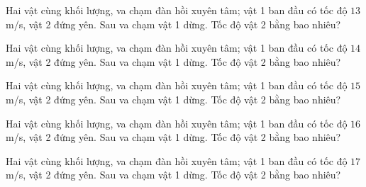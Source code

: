 \begin{ex}
Hai vật cùng khối lượng, va chạm đàn hồi xuyên tâm; vật 1 ban đầu có tốc độ $13$ m/s, vật 2 đứng yên. Sau va chạm vật 1 dừng. Tốc độ vật 2 bằng bao nhiêu?
\end{ex}

\begin{ex}
Hai vật cùng khối lượng, va chạm đàn hồi xuyên tâm; vật 1 ban đầu có tốc độ $14$ m/s, vật 2 đứng yên. Sau va chạm vật 1 dừng. Tốc độ vật 2 bằng bao nhiêu?
\end{ex}

\begin{ex}
Hai vật cùng khối lượng, va chạm đàn hồi xuyên tâm; vật 1 ban đầu có tốc độ $15$ m/s, vật 2 đứng yên. Sau va chạm vật 1 dừng. Tốc độ vật 2 bằng bao nhiêu?
\end{ex}

\begin{ex}
Hai vật cùng khối lượng, va chạm đàn hồi xuyên tâm; vật 1 ban đầu có tốc độ $16$ m/s, vật 2 đứng yên. Sau va chạm vật 1 dừng. Tốc độ vật 2 bằng bao nhiêu?
\end{ex}

\begin{ex}
Hai vật cùng khối lượng, va chạm đàn hồi xuyên tâm; vật 1 ban đầu có tốc độ $17$ m/s, vật 2 đứng yên. Sau va chạm vật 1 dừng. Tốc độ vật 2 bằng bao nhiêu?
\end{ex}

